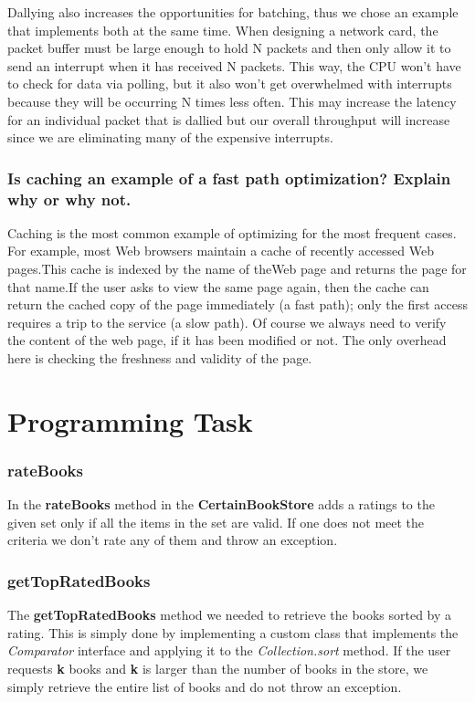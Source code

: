 \documentclass{article}      %
\begin{document}
Dallying also increases the opportunities for batching, thus we chose an example that implements both at the same time. When designing a network card, the packet buffer must be large enough to hold N packets and then only allow it to send an interrupt when it has received N packets. This way, the CPU won't have to check for data via polling, but it also won't get overwhelmed with interrupts because they will be occurring N times less often. This may increase the latency for an individual packet that is dallied but our overall throughput will increase since we are eliminating many of the expensive interrupts.\\

\subsubsection{Is caching an example of a fast path optimization? Explain why or why not.}

Caching is the most common example of optimizing for the most frequent cases. For example, most Web browsers maintain a cache of recently accessed Web pages.This cache is indexed by the name of theWeb page and returns the page for that name.If the user asks to view the same page again, then the cache can return the cached copy of the page immediately (a fast path); only the first access requires a trip to the service (a slow path). Of course we always need to verify the content of the web page, if it has been modified or not. The only overhead here is checking the freshness and validity of the page.\\

\section*{Programming Task}

\subsubsection*{rateBooks}
In the {\bf rateBooks} method in the {\bf CertainBookStore} adds a ratings to the given set only if all the items in the set are valid. If one does not meet the criteria we don't rate any of them and throw an exception.\\
\subsubsection*{getTopRatedBooks}
The {\bf getTopRatedBooks} method we needed to retrieve the books sorted by a rating. This is simply done by implementing a custom class that implements the \emph{Comparator} interface and applying it  to the \emph{Collection.sort} method. If the user requests {\bf k} books and {\bf k} is larger than the number of books in the store, we simply retrieve the entire list of books and do not throw an exception.\\
\end{document}

